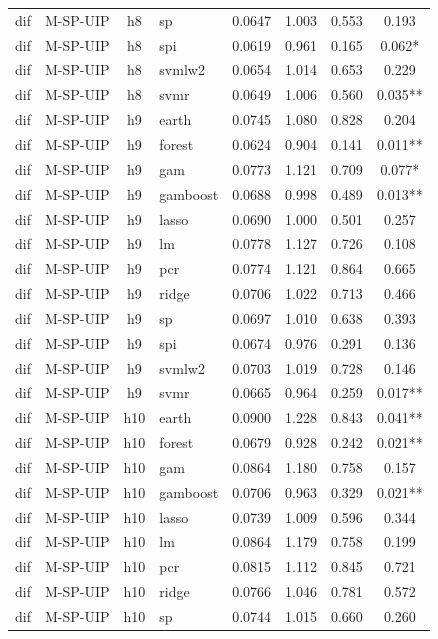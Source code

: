 \begin{ThreePartTable}
\begin{longtable}[t]{llclcccc}
dif & M-SP-UIP & h8 & sp & 0.0647 & 1.003 & 0.553 & 0.193\\
dif & M-SP-UIP & h8 & spi & 0.0619 & 0.961 & 0.165 & 0.062*\\
dif & M-SP-UIP & h8 & svmlw2 & 0.0654 & 1.014 & 0.653 & 0.229\\
dif & M-SP-UIP & h8 & svmr & 0.0649 & 1.006 & 0.560 & 0.035**\\
\addlinespace
dif & M-SP-UIP & h9 & earth & 0.0745 & 1.080 & 0.828 & 0.204\\
dif & M-SP-UIP & h9 & forest & 0.0624 & 0.904 & 0.141 & 0.011**\\
dif & M-SP-UIP & h9 & gam & 0.0773 & 1.121 & 0.709 & 0.077*\\
dif & M-SP-UIP & h9 & gamboost & 0.0688 & 0.998 & 0.489 & 0.013**\\
dif & M-SP-UIP & h9 & lasso & 0.0690 & 1.000 & 0.501 & 0.257\\
dif & M-SP-UIP & h9 & lm & 0.0778 & 1.127 & 0.726 & 0.108\\
dif & M-SP-UIP & h9 & pcr & 0.0774 & 1.121 & 0.864 & 0.665\\
dif & M-SP-UIP & h9 & ridge & 0.0706 & 1.022 & 0.713 & 0.466\\
dif & M-SP-UIP & h9 & sp & 0.0697 & 1.010 & 0.638 & 0.393\\
dif & M-SP-UIP & h9 & spi & 0.0674 & 0.976 & 0.291 & 0.136\\
dif & M-SP-UIP & h9 & svmlw2 & 0.0703 & 1.019 & 0.728 & 0.146\\
dif & M-SP-UIP & h9 & svmr & 0.0665 & 0.964 & 0.259 & 0.017**\\
\addlinespace
dif & M-SP-UIP & h10 & earth & 0.0900 & 1.228 & 0.843 & 0.041**\\
dif & M-SP-UIP & h10 & forest & 0.0679 & 0.928 & 0.242 & 0.021**\\
dif & M-SP-UIP & h10 & gam & 0.0864 & 1.180 & 0.758 & 0.157\\
dif & M-SP-UIP & h10 & gamboost & 0.0706 & 0.963 & 0.329 & 0.021**\\
dif & M-SP-UIP & h10 & lasso & 0.0739 & 1.009 & 0.596 & 0.344\\
dif & M-SP-UIP & h10 & lm & 0.0864 & 1.179 & 0.758 & 0.199\\
dif & M-SP-UIP & h10 & pcr & 0.0815 & 1.112 & 0.845 & 0.721\\
dif & M-SP-UIP & h10 & ridge & 0.0766 & 1.046 & 0.781 & 0.572\\
dif & M-SP-UIP & h10 & sp & 0.0744 & 1.015 & 0.660 & 0.260\\

\end{longtable}
\end{ThreePartTable}
